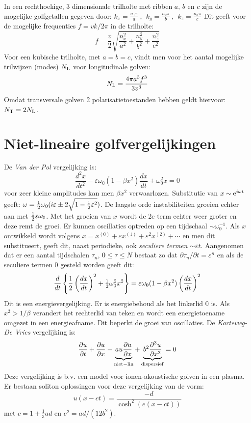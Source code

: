 In een rechthoekige, 3 dimensionale trilholte met ribben $a$, $b$ en $c$ zijn
de mogelijke golfgetallen gegeven door:
$\displaystyle k_x=\frac{n_1\pi}{a}~,~~k_y=\frac{n_2\pi}{b}~,~~k_z=\frac{n_3\pi}{c}$
Dit geeft voor de mogelijke frequenties $f=vk/2\pi$ in de trilholte:
\[
f=\frac{v}{2}\sqrt{\frac{n_x^2}{a^2}+\frac{n_y^2}{b^2}+\frac{n_z^2}{c^2}}
\]
Voor een kubische trilholte, met $a=b=c$, vindt men voor het aantal mogelijke
trilwijzen (modes) $N_{\rm L}$ voor longitudinale golven:
\[
N_{\rm L}=\frac{4\pi a^3f^3}{3v^3}
\]
Omdat transversale golven 2 polarisatietoestanden hebben geldt hiervoor:
$N_{\rm T}=2N_{\rm L}$.

\section{Niet-lineaire golfvergelijkingen}
De {\it Van der Pol} vergelijking is:
\[
\frac{d^2x}{dt^2}-\varepsilon\omega_0(1-\beta x^2)\frac{dx}{dt}+\omega_0^2x=0
\]
voor zeer kleine amplitudes kan men $\beta x^2$ verwaarlozen. Substitutie van
$x\sim{\rm e}^{i\omega t}$ geeft:
$\omega=\mbox{$\frac{1}{2}$}\omega_0(i\varepsilon\pm2\sqrt{1-\frac{1}{2}\varepsilon^2})$.
De laagste orde instabiliteiten groeien echter aan met
$\mbox{$\frac{1}{2}$}\varepsilon\omega_0$. Met het groeien van $x$ wordt de 2e term echter
weer groter en deze remt de groei. Er kunnen oscillaties optreden op een
tijdschaal $\sim\omega_0^{-1}$. Als $x$ ontwikkeld wordt volgens
$x=x^{(0)}+\varepsilon x^{(1)}+\varepsilon^2x^{(2)}+\cdots$ en men dit
substitueert, geeft dit, naast periodieke, ook {\it seculiere termen}
$\sim\varepsilon t$. Aangenomen dat er een aantal tijdschalen $\tau_n$,
$0\leq\tau\leq N$ bestaat zo dat $\partial\tau_n/\partial t=\varepsilon^n$ en
als de seculiere termen 0 gesteld worden geeft dit:
\[
\frac{d}{dt}\left\{\frac{1}{2}\left(\frac{dx}{dt}\right)^2+\mbox{$\frac{1}{2}$}\omega_0^2x^2\right\}=
\varepsilon\omega_0(1-\beta x^2)\left(\frac{dx}{dt}\right)^2
\]
Dit is een energievergelijking. Er is energiebehoud als het linkerlid 0 is.
Als $x^2>1/\beta$ verandert het rechterlid van teken en wordt een
energietoename omgezet in een energieafname. Dit beperkt de groei van
oscillaties.
\npar
De {\it Korteweg-De Vries} vergelijking is:
\[
\frac{\partial u}{\partial t}+\frac{\partial u}{\partial x}-\underbrace{au\frac{\partial u}{\partial x}}_{\rm niet-lin}+
\underbrace{b^2\frac{\partial ^3u}{\partial x^3}}_{\rm dispersief}=0
\]
Deze vergelijking is b.v. een model voor ionen-akoustische golven in een
plasma. Er bestaan soliton oplossingen voor deze vergelijking van de vorm:
\[
u(x-ct)=\frac{-d}{\cosh^2(e(x-ct))}
\]
met $c=1+\frac{1}{3}ad$ en $e^2=ad/(12b^2)$.

